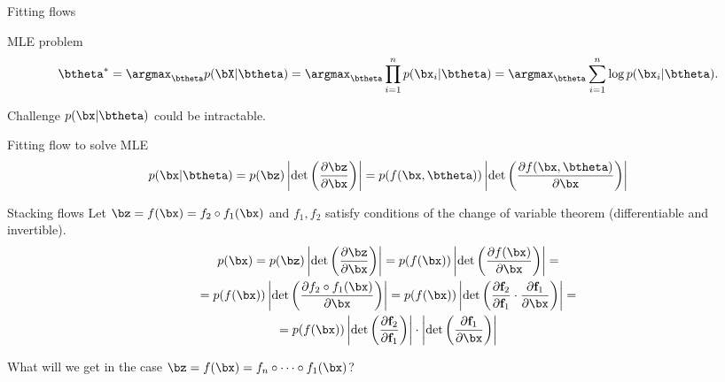 \begin{frame}{Fitting flows}
	\begin{block}{MLE problem}
		\vspace{-0.3cm}
		\[
		\btheta^* = \argmax_{\btheta} p(\bX | \btheta) = \argmax_{\btheta} \prod_{i=1}^n p(\bx_i | \btheta) = \argmax_{\btheta} \sum_{i=1}^n \log p(\bx_i | \btheta).
		\]
		\vspace{-0.3cm}
	\end{block}
	\begin{block}{Challenge}
		$p(\bx | \btheta)$ could be intractable.
	\end{block}
	\begin{block}{Fitting flow to solve MLE}
		\[
		p(\bx|\btheta) = p(\bz) \left|\det \left(  \frac{\partial \bz}{\partial \bx} \right) \right|  = p(f(\bx, \btheta)) \left|\det \left( \frac{\partial f(\bx, \btheta)}{\partial \bx} \right) \right|
		\]
	\end{block}
\end{frame}
\begin{frame}{Stacking flows}
	Let $\bz = f(\bx) = f_2 \circ f_1(\bx)$ and $f_1, f_2$ satisfy conditions of the change of variable theorem (differentiable and invertible).
	\begin{multline*}
		p(\bx) = p(\bz) \left|\det \left(  \frac{\partial \bz}{\partial \bx} \right) \right| = p(f(\bx)) \left|\det \left(  \frac{\partial f(\bx)}{\partial \bx} \right) \right| = \\
		= p(f(\bx)) \left|\det \left(\frac{\partial f_2 \circ f_1(\bx)}{\partial \bx} \right) \right| =
		p(f(\bx)) \left|\det \left(\frac{\partial \textbf{f}_2}{\partial \textbf{f}_1} \cdot \frac{\partial \textbf{f}_1}{\partial \bx} \right) \right| = \\
		= p(f(\bx))  \left|\det \left(\frac{\partial \textbf{f}_2}{\partial \textbf{f}_1} \right) \right| \cdot \left| \det \left( \frac{\partial \textbf{f}_1}{\partial \bx} \right) \right|
	\end{multline*}

	What will we get in the case $\bz = f(\bx) = f_n \circ \dots \circ f_1(\bx)$?
\end{frame}
